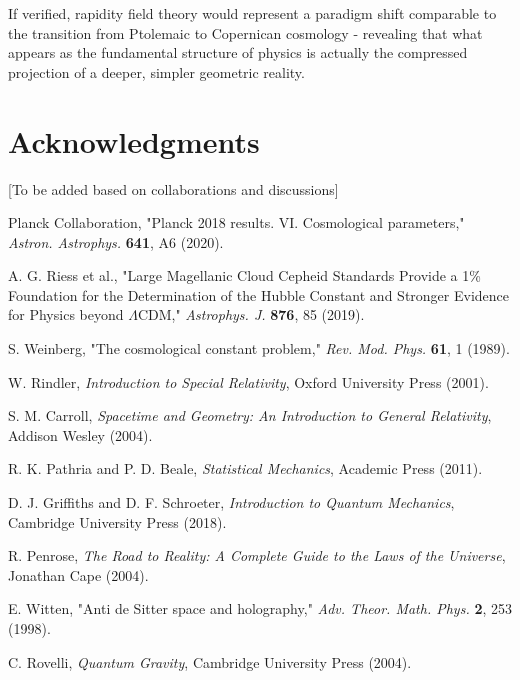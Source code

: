 \documentclass[12pt,a4paper]{article}
\begin{document}
If verified, rapidity field theory would represent a paradigm shift comparable to the transition from Ptolemaic to Copernican cosmology - revealing that what appears as the fundamental structure of physics is actually the compressed projection of a deeper, simpler geometric reality.

\section*{Acknowledgments}

[To be added based on collaborations and discussions]


\begin{thebibliography}{99}

Planck Collaboration, "Planck 2018 results. VI. Cosmological parameters," \textit{Astron. Astrophys.} \textbf{641}, A6 (2020).

A. G. Riess et al., "Large Magellanic Cloud Cepheid Standards Provide a 1\% Foundation for the Determination of the Hubble Constant and Stronger Evidence for Physics beyond $\Lambda$CDM," \textit{Astrophys. J.} \textbf{876}, 85 (2019).

S. Weinberg, "The cosmological constant problem," \textit{Rev. Mod. Phys.} \textbf{61}, 1 (1989).

W. Rindler, \textit{Introduction to Special Relativity}, Oxford University Press (2001).

S. M. Carroll, \textit{Spacetime and Geometry: An Introduction to General Relativity}, Addison Wesley (2004).

R. K. Pathria and P. D. Beale, \textit{Statistical Mechanics}, Academic Press (2011).

D. J. Griffiths and D. F. Schroeter, \textit{Introduction to Quantum Mechanics}, Cambridge University Press (2018).

R. Penrose, \textit{The Road to Reality: A Complete Guide to the Laws of the Universe}, Jonathan Cape (2004).

E. Witten, "Anti de Sitter space and holography," \textit{Adv. Theor. Math. Phys.} \textbf{2}, 253 (1998).

C. Rovelli, \textit{Quantum Gravity}, Cambridge University Press (2004).

\end{thebibliography}
\end{document}

